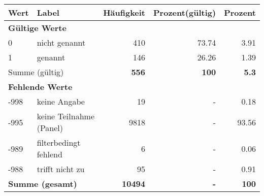      \begin{longtable}{lXrrr}
     \toprule
     \textbf{Wert} & \textbf{Label} & \textbf{Häufigkeit} & \textbf{Prozent(gültig)} & \textbf{Prozent} \\
     \endhead
     \midrule
     \multicolumn{5}{l}{\textbf{Gültige Werte}}\\

     0 &
     \multicolumn{1}{X}{ nicht genannt   } &


       \num{410} &
       \num[round-mode=places,round-precision=2]{73,74} &
         \num[round-mode=places,round-precision=2]{3,91} \\

     1 &
     \multicolumn{1}{X}{ genannt   } &


       \num{146} &
       \num[round-mode=places,round-precision=2]{26,26} &
         \num[round-mode=places,round-precision=2]{1,39} \\
     \midrule
     \multicolumn{2}{l}{Summe (gültig)} &
       \textbf{\num{556}} &
     \textbf{100} &
       \textbf{\num[round-mode=places,round-precision=2]{5,3}} \\
     \multicolumn{5}{l}{\textbf{Fehlende Werte}}\\
       -998 &
       keine Angabe &
         \num{19} &
        - &
         \num[round-mode=places,round-precision=2]{0,18} \\
       -995 &
       keine Teilnahme (Panel) &
         \num{9818} &
        - &
         \num[round-mode=places,round-precision=2]{93,56} \\
       -989 &
       filterbedingt fehlend &
         \num{6} &
        - &
         \num[round-mode=places,round-precision=2]{0,06} \\
       -988 &
       trifft nicht zu &
         \num{95} &
        - &
         \num[round-mode=places,round-precision=2]{0,91} \\
     \midrule
     \multicolumn{2}{l}{\textbf{Summe (gesamt)}} &
          \textbf{\num{10494}} &
        \textbf{-} &
        \textbf{100} \\
     \bottomrule
     \end{longtable}
     
